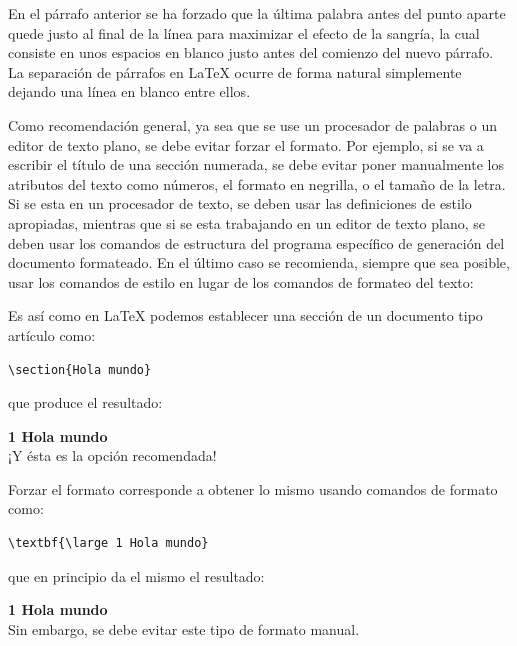 \documentclass{article}
\begin{document}
En el párrafo anterior se ha forzado que la última palabra antes del punto aparte quede justo al final de la línea para maximizar el efecto de la sangría, la  cual consiste en unos espacios en blanco justo antes del comienzo del nuevo párrafo. La separación de párrafos en LaTeX ocurre de forma natural simplemente dejando una línea en blanco entre ellos. 

Como recomendación general, ya sea que se use un procesador de palabras o un editor de texto plano, se debe evitar forzar el formato. Por ejemplo, si se va a escribir el título de una sección numerada, se debe evitar poner manualmente los atributos del texto como números, el formato en negrilla, o el tamaño de la letra. Si se esta en un procesador de texto, se deben usar las definiciones de estilo apropiadas, mientras que si se esta trabajando en un editor de texto plano, se deben usar los comandos de estructura del programa específico de generación del documento formateado. En el último caso se recomienda, siempre que sea posible, usar los comandos de estilo en lugar de los comandos de formateo del texto:

Es así como en \LaTeX{} podemos establecer una sección de un documento tipo artículo como:
\begin{lstlisting}
\section{Hola mundo}
\end{lstlisting}
que produce el resultado:

\noindent \textbf{\large 1 Hola mundo}\\
¡Y ésta es la opción recomendada!     

Forzar el formato corresponde a obtener lo mismo usando comandos de formato como:
\begin{lstlisting}
\textbf{\large 1 Hola mundo}
\end{lstlisting}
que en principio da el mismo el resultado:

\noindent \textbf{\large 1 Hola mundo}\\
Sin embargo, se debe evitar este tipo de formato manual.
\end{document}
